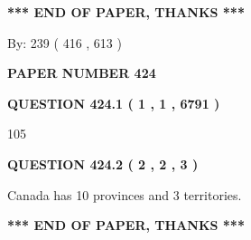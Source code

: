 \documentclass[12pt]{article}
\begin{document}
   
   
   
   
\vspace{1.0in} 
{\textbf{\large{ *** END OF PAPER, THANKS *** }}} 
   
   
\hspace{1.0in} By: 
 239 ( 416 ,  613 )
   
   
   
   
\newpage 
\setcounter{page}{ 
   424001 } 
   
   
   
   
 {\textbf{ \Large{ PAPER NUMBER  424  }}}
   
   
\vspace{0.2in}
   
   
   
   
   
   
 \vspace{0.2in}
 
 
 
 
   
   
  
\vspace{0.2in}
  
{\textbf{\Large{QUESTION
424.1 
 ( 1 , 1 , 6791 )
}}}
  
  
 
 
\noindent{}

105
 
 
  
\vspace{0.2in}
  
{\textbf{\Large{QUESTION
424.2 
 ( 2 , 2 , 3 )
}}}
  
  
 
 
\noindent{}
 
 
Canada has 10  provinces and 3 territories.
 
 
 
 
   
   
 \vspace{0.2in}
 
   
   
   
   
\vspace{1.0in} 
{\textbf{\large{ *** END OF PAPER, THANKS *** }}} 
   
\end{document}
